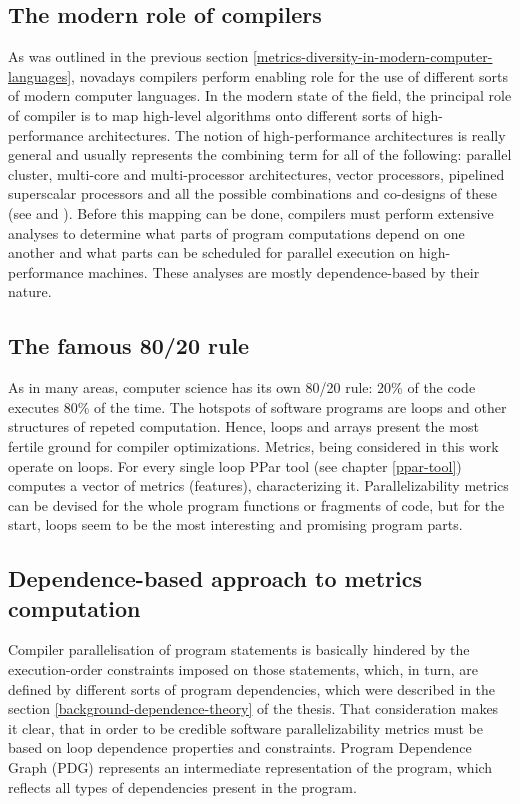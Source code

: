 \subsection{The modern role of compilers}
\label{metrics-modern-role-of-compilers}
\quad As was outlined in the previous section \ref{metrics-diversity-in-modern-computer-languages}, novadays compilers perform enabling role for the use of different sorts of modern computer languages. \newline
\null\quad In the modern state of the field, the principal role of compiler is to map high-level algorithms onto different sorts of high-performance architectures. The notion of high-performance architectures is really general and usually represents the combining term for all of the following: parallel cluster, multi-core and multi-processor architectures, vector processors, pipelined superscalar processors and all the possible combinations and co-designs of these (see \cite{patterson-and-hennessy-cod} and \cite{patterson-and-hennessy-quantitative-approach}).\newline
\null\quad Before this mapping can be done, compilers must perform extensive analyses to determine what parts of program computations depend on one another and what parts can be scheduled for parallel execution on high-performance machines. These analyses are mostly dependence-based by their nature.   

\subsection{The famous 80/20 rule}
\label{metrics-famous-80-20-rule}
\qquad As in many areas, computer science has its own 80/20 rule: 20\% of the code executes 80\% of the time. The hotspots of software programs are loops and other structures of repeted computation. Hence, loops and arrays present the most fertile ground for compiler optimizations. Metrics, being considered in this work operate on loops. For every single loop PPar tool (see chapter \ref{ppar-tool}) computes a vector of metrics (features), characterizing it. Parallelizability metrics can be devised for the whole program functions or fragments of code, but for the start, loops seem to be the most interesting and promising program parts. 

\subsection{Dependence-based approach to metrics computation}
\label{metrics-dependence-based-approach}
\qquad Compiler parallelisation of program statements is basically hindered by the execution-order constraints imposed on those statements, which, in turn, are defined by different sorts of program dependencies, which were described in the section \ref{background-dependence-theory} of the thesis. That consideration makes it clear, that in order to be credible software parallelizability metrics must be based on loop dependence properties and constraints. Program Dependence Graph (PDG) represents an intermediate representation of the program, which reflects all types of dependencies present in the program. 

